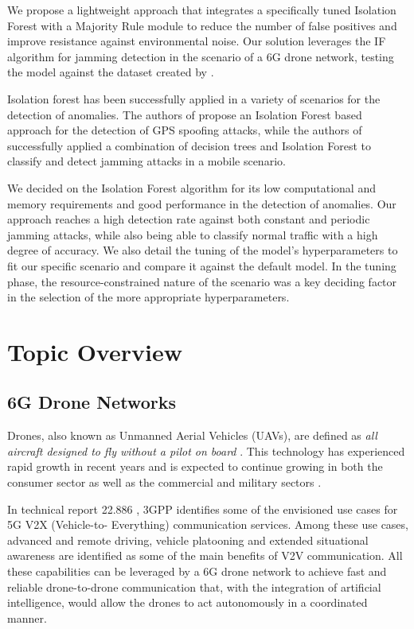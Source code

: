 \documentclass[futureinternet,article,submit,pdftex,moreauthors]{Definitions/mdpi}
\begin{document}
We propose a lightweight approach that integrates a specifically tuned Isolation Forest with a Majority Rule module to reduce the number of false positives and improve resistance against environmental noise.
Our solution leverages the IF algorithm for jamming detection in the scenario of a 6G drone network, testing the model against the dataset created by \cite{JammingDetectionIoT-Hussain}.

Isolation forest has been successfully applied in a variety of scenarios for the detection of anomalies.
The authors of \cite{GPSSpoofingDetection-Zuo} propose an Isolation Forest based approach for the detection of GPS spoofing attacks, while the authors of \cite{HybridJammingDetection-Hong} successfully applied a combination of decision trees and Isolation Forest to classify 
and detect jamming attacks in a mobile scenario. 

We decided on the Isolation Forest algorithm for its low computational and memory requirements and good performance in the detection of anomalies.
Our approach reaches a high detection rate against both constant and periodic jamming attacks, while also being able to classify normal traffic with a high degree of accuracy. We also detail the tuning of the model's hyperparameters to fit our specific scenario and compare it 
against the default model. In the tuning phase, the resource-constrained nature of the scenario was a key deciding factor in the selection of the more appropriate hyperparameters.

\section{Topic Overview}

\subsection{6G Drone Networks}

Drones, also known as Unmanned Aerial Vehicles (UAVs), are defined as \textit{all aircraft designed to fly
without a pilot on board} \cite{DronesEC}. This technology has experienced rapid growth in recent years and is expected to 
continue growing in both the consumer sector as well as the commercial and military sectors \cite{DronesStatisticsLaricchia}.

In technical report 22.886 \cite{5GV2XSultan}, 3GPP identifies some of the envisioned use cases for 5G V2X (Vehicle-to-
Everything) communication services. Among these use cases, advanced and remote driving, vehicle platooning and extended situational awareness are identified as some of the main benefits
of V2V communication. All these capabilities can be leveraged by a 6G drone network to achieve fast and reliable drone-to-drone communication that, with the integration of artificial intelligence, 
would allow the drones to act autonomously in a coordinated manner. 
\end{document}
